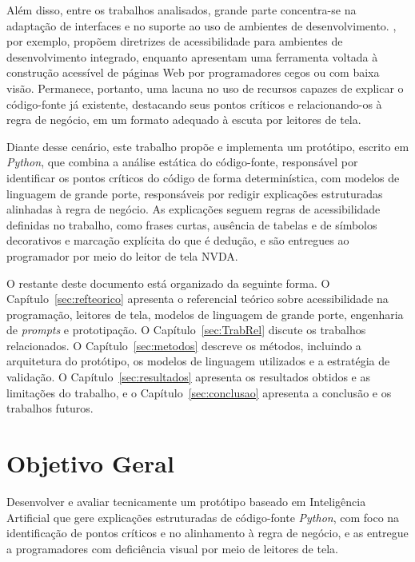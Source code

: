 \documentclass[
    12pt,                   %
    openright,              %
    oneside,                %
    a4paper,                %
    sumario=tradicional,    %
    english,                %
    brazil,                 %
    ]{abntex2}
\begin{document}
Além disso, entre os trabalhos analisados, grande parte concentra-se na adaptação de interfaces e no suporte ao uso de ambientes de desenvolvimento. \textcite{latinoware37693}, por exemplo, propõem diretrizes de acessibilidade para ambientes de desenvolvimento integrado, enquanto \textcite{latinoware40920} apresentam uma ferramenta voltada à construção acessível de páginas Web por programadores cegos ou com baixa visão. Permanece, portanto, uma lacuna no uso de recursos capazes de explicar o código-fonte já existente, destacando seus pontos críticos e relacionando-os à regra de negócio, em um formato adequado à escuta por leitores de tela.

Diante desse cenário, este trabalho propõe e implementa um protótipo, escrito em \textit{Python}, que combina a análise estática do código-fonte, responsável por identificar os pontos críticos do código de forma determinística, com modelos de linguagem de grande porte, responsáveis por redigir explicações estruturadas alinhadas à regra de negócio. As explicações seguem regras de acessibilidade definidas no trabalho, como frases curtas, ausência de tabelas e de símbolos decorativos e marcação explícita do que é dedução, e são entregues ao programador por meio do leitor de tela NVDA.

O restante deste documento está organizado da seguinte forma. O Capítulo~\ref{sec:refteorico} apresenta o referencial teórico sobre acessibilidade na programação, leitores de tela, modelos de linguagem de grande porte, engenharia de \textit{prompts} e prototipação. O Capítulo~\ref{sec:TrabRel} discute os trabalhos relacionados. O Capítulo~\ref{sec:metodos} descreve os métodos, incluindo a arquitetura do protótipo, os modelos de linguagem utilizados e a estratégia de validação. O Capítulo~\ref{sec:resultados} apresenta os resultados obtidos e as limitações do trabalho, e o Capítulo~\ref{sec:conclusao} apresenta a conclusão e os trabalhos futuros.

\section{Objetivo Geral}\label{sec:objetivos}

Desenvolver e avaliar tecnicamente um protótipo baseado em Inteligência Artificial que gere explicações estruturadas de código-fonte \textit{Python}, com foco na identificação de pontos críticos e no alinhamento à regra de negócio, e as entregue a programadores com deficiência visual por meio de leitores de tela.
\end{document}
